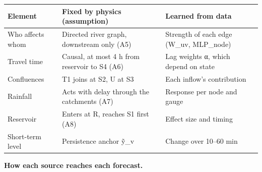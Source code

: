 \documentclass[11pt]{article}
\newcounter{none} %
\begin{document}
{\def\LTcaptype{none} %
\begin{longtable}[]{@{}
  >{\raggedright\arraybackslash}p{}
  >{\raggedright\arraybackslash}p{}
  >{\raggedright\arraybackslash}p{}@{}}
\toprule\noalign{}
\begin{minipage}[b]{\linewidth}\raggedright
Element
\end{minipage} & \begin{minipage}[b]{\linewidth}\raggedright
Fixed by physics (assumption)
\end{minipage} & \begin{minipage}[b]{\linewidth}\raggedright
Learned from data
\end{minipage} \\
\midrule\noalign{}
\endhead
\bottomrule\noalign{}
\endlastfoot
Who affects whom & Directed river graph, downstream only (A5) & Strength of each edge (W\_uv, MLP\_node) \\
Travel time & Causal, at most 4 h from reservoir to S4 (A6) & Lag weights α, which depend on state \\
Confluences & T1 joins at S2, U at S3 & Each inflow's contribution \\
Rainfall & Acts with delay through the catchments (A7) & Response per node and gauge \\
Reservoir & Enters at R, reaches S1 first (A8) & Effect size and timing \\
Short-term level & Persistence anchor ỹ\_v & Change over 10--60 min \\
\end{longtable}
}

\textbf{How each source reaches each forecast.}
\end{document}
